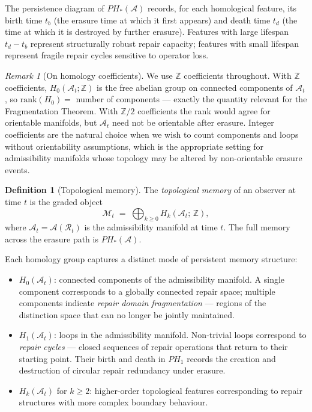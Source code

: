 \documentclass[12pt, oneside]{article}
\theoremstyle{plain}
\theoremstyle{definition}
\newtheorem{definition}[theorem]{Definition}
\theoremstyle{remark}
\newtheorem{remark}[theorem]{Remark}
\newcommand{\AO}{\mathcal{A}}
\newcommand{\At}{\mathcal{A}_t}
\newcommand{\Rt}{\mathcal{R}_t}
\newcommand{\Mem}{\mathcal{M}}
\begin{document}
The persistence diagram of $PH_*(\AO)$ records, for each
homological feature, its birth time $t_b$ (the erasure time at
which it first appears) and death time $t_d$ (the time at which
it is destroyed by further erasure).
Features with large lifespan $t_d - t_b$ represent structurally
robust repair capacity; features with small lifespan represent
fragile repair cycles sensitive to operator loss.

\begin{remark}[On homology coefficients]
  We use $\mathbb{Z}$ coefficients throughout.
  With $\mathbb{Z}$ coefficients, $H_0(\At; \mathbb{Z})$ is the
  free abelian group on connected components of $\At$, so
  $\mathrm{rank}(H_0) = $ number of components --- exactly the
  quantity relevant for the Fragmentation Theorem.
  With $\mathbb{Z}/2$ coefficients the rank would agree for
  orientable manifolds, but $\At$ need not be orientable after
  erasure.
  Integer coefficients are the natural choice when we wish to
  count components and loops without orientability assumptions,
  which is the appropriate setting for admissibility manifolds
  whose topology may be altered by non-orientable erasure events.
\end{remark}

\begin{definition}[Topological memory]
  The \emph{topological memory} of an observer at time $t$ is
  the graded object
  \[
    \Mem_t
    \;=\;
    \bigoplus_{k \geq 0} H_k(\At;\, \mathbb{Z}),
  \]
  where $\At = \AO(\Rt)$ is the admissibility manifold at time $t$.
  The full memory across the erasure path is $PH_*(\AO)$.
\end{definition}

Each homology group captures a distinct mode of persistent memory
structure:

\begin{itemize}
  \item $H_0(\At)$: connected components of the admissibility
    manifold.
    A single component corresponds to a globally connected repair
    space; multiple components indicate \emph{repair domain
    fragmentation} --- regions of the distinction space that can
    no longer be jointly maintained.

  \item $H_1(\At)$: loops in the admissibility manifold.
    Non-trivial loops correspond to \emph{repair cycles} ---
    closed sequences of repair operations that return to their
    starting point.
    Their birth and death in $PH_1$ records the creation and
    destruction of circular repair redundancy under erasure.

  \item $H_k(\At)$ for $k \geq 2$: higher-order topological
    features corresponding to repair structures with more complex
    boundary behaviour.
\end{itemize}
\end{document}
